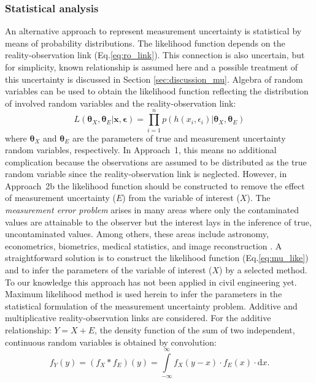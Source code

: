 \subsubsection{Statistical analysis}
An alternative approach to represent measurement uncertainty is statistical by means of probability distributions. The likelihood function depends on the reality-observation link (Eq.\ref{eq:ro_link}). This connection is also uncertain, but for simplicity, known relationship is assumed here and a possible treatment of this uncertainty is discussed in Section \ref{sec:discussion_mu}. Algebra of random variables can be used to obtain the likelihood function reflecting the distribution of involved random variables and the reality-observation link:
\begin{equation}
\label{eq:mu_like}
	L\left( {{{\boldsymbol{\theta }}_X},{{\boldsymbol{\theta }}_E}|{\mathbf{x}},{\boldsymbol{\epsilon }}} \right) = \prod\limits_{i = 1}^n {p\left( {h({x_i},{\epsilon _i})|{{\boldsymbol{\theta }}_X},{{\boldsymbol{\theta }}_E}} \right)}
\end{equation}
where ${\boldsymbol{\theta }}_X$ and ${\boldsymbol{\theta }}_E$ are the parameters of true and measurement uncertainty random variables, respectively.
In Approach~1, this means no additional complication because the observations are assumed to be distributed as the true random variable since the reality-observation link is neglected. However, in Approach~2b the likelihood function should be constructed to remove the effect of measurement uncertainty ($E$) from the variable of interest ($X$).
The \textit{measurement error problem} arises in many areas where only the contaminated values are attainable to the observer but the interest lays in the inference of true, uncontaminated values. Among others, these areas include astronomy, econometrics, biometrics, medical statistics, and image reconstruction \citep{Stefanski2000, Koen2009, Meister2009}. A straightforward solution is to construct the likelihood function (Eq.\ref{eq:mu_like}) and to infer the parameters of the variable of interest ($X$) by a selected method. To our knowledge this approach has not been applied in civil engineering yet.
Maximum likelihood method is used herein to infer the parameters in the statistical formulation of the measurement uncertainty problem.
Additive and multiplicative reality-observation links are considered. For the additive relationship: $Y = X + E$, the density function of the sum of two independent, continuous random variables is obtained by convolution:
\begin{equation}
\label{eq:conv}
	{f_Y}\left( y \right) = \left( {{f_X} * {f_E}} \right)\left( y \right) = \int\limits_{ - \infty }^\infty  {{f_X}\left( {y - x} \right)}  \cdot {f_E}\left( x \right) \cdot {\mathrm{d}}x.
\end{equation}
